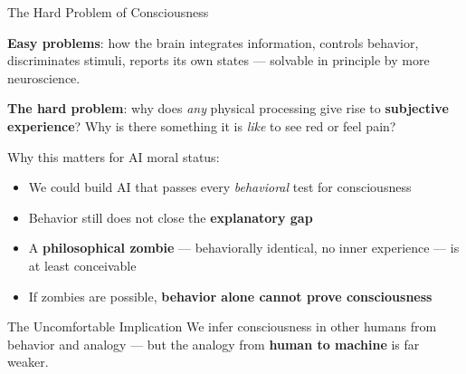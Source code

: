 \documentclass[aspectratio=169,11pt]{beamer}
\begin{document}
\begin{frame}[shrink=8]{The Hard Problem of Consciousness}
\begin{conceptbox}
\small
\textbf{Easy problems}: how the brain integrates information, controls behavior, discriminates stimuli, reports its own states --- solvable in principle by more neuroscience.

\textbf{The hard problem}: why does \emph{any} physical processing give rise to \textbf{subjective experience}? Why is there something it is \emph{like} to see red or feel pain?
\end{conceptbox}

Why this matters for AI moral status:
\begin{itemize}
    \item We could build AI that passes every \emph{behavioral} test for consciousness
    \item Behavior still does not close the \textbf{explanatory gap}
    \item A \textbf{philosophical zombie} --- behaviorally identical, no inner experience --- is at least conceivable
    \item If zombies are possible, \textbf{behavior alone cannot prove consciousness}
\end{itemize}

\begin{alertblock}{The Uncomfortable Implication}
\scriptsize
We infer consciousness in other humans from behavior and analogy --- but the analogy from \textbf{human to machine} is far weaker.
\end{alertblock}
\end{frame}
\end{document}
